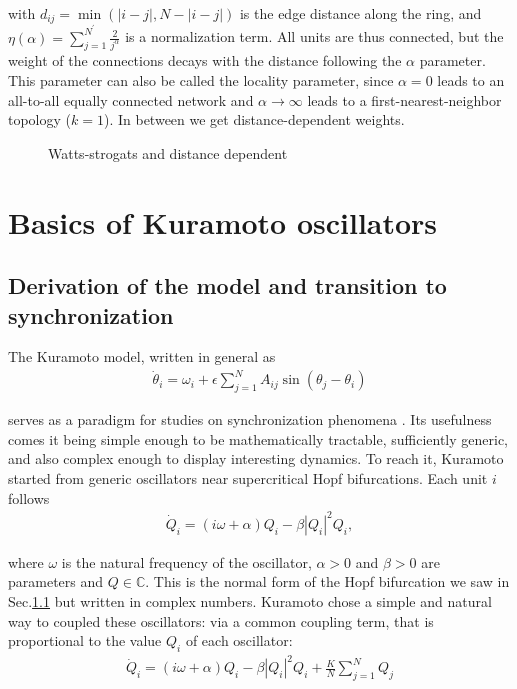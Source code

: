 with $d_{ij} = \min(|i-j|, N-|i-j|)$ is the edge distance along the ring, and $\eta(\alpha) = \sum_{j=1}^{N^\prime} \frac{2}{j^\alpha}$ is a normalization term. All units are thus connected, but the weight of the connections decays with the distance following the $\alpha$ parameter. This parameter can also be called the locality parameter, since $\alpha=0$ leads to an all-to-all equally connected network and $\alpha\to\infty$ leads to a first-nearest-neighbor topology ($k=1$). In between we get distance-dependent weights.
%
\begin{figure}
    
    \caption{Watts-strogats and distance dependent}
\end{figure}


\section{Basics of Kuramoto oscillators}
\subsection{Derivation of the model and transition to synchronization}
The Kuramoto model, written in general as 
\begin{align}
    \dot{\theta}_i = \omega_i + \epsilon \sum_{j=1}^N A_{ij} \sin(\theta_j-\theta_i)
    \label{eq:kuramoto-general}
\end{align}

serves as a paradigm for studies on synchronization phenomena \cite{bocalettisyncbook}. Its usefulness comes it being simple enough to be mathematically tractable, sufficiently generic, and also complex enough to display interesting dynamics. To reach it, Kuramoto started from generic oscillators near supercritical Hopf bifurcations. Each unit $i$ follows 
\begin{align}
    \dot{Q}_i = (i\omega + \alpha) Q_i - \beta|Q_i|^2 Q_i,
\end{align}

where $\omega$ is the natural frequency of the oscillator, $\alpha>0$ and $\beta>0$ are parameters and $Q \in \mathbb{C}$. This is the normal form of the Hopf bifurcation we saw in Sec.\ref{} but written in complex numbers. Kuramoto chose a simple and natural way to coupled these oscillators: via a common coupling term, that is proportional to the value $Q_i$ of each oscillator: 
%
\begin{align}
    \dot{Q}_i = (i\omega + \alpha) Q_i - \beta|Q_i|^2 Q_i + \frac{K}{N} \sum_{j=1}^{N} Q_j
    \label{eq:stuartlandaucoupled}
\end{align}

